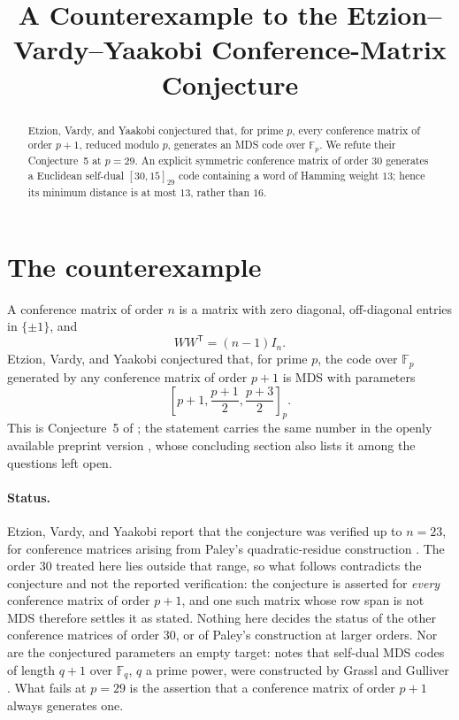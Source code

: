 \documentclass[11pt]{amsart}
\title[A conference-matrix counterexample]
{A Counterexample to the Etzion--Vardy--Yaakobi Conference-Matrix Conjecture}
\date{}
\newcommand{\F}{\mathbb{F}}
\begin{document}
\begin{abstract}
Etzion, Vardy, and Yaakobi conjectured that, for prime $p$, every
conference matrix of order $p+1$, reduced modulo $p$, generates an
MDS code over $\F_p$. We refute their Conjecture~5 at $p=29$.
An explicit symmetric conference matrix of order $30$ generates a
Euclidean self-dual $[30,15]_{29}$ code containing a word of Hamming
weight $13$; hence its minimum distance is at most $13$, rather than
$16$.
\end{abstract}

\maketitle

\section{The counterexample}

A conference matrix of order $n$ is a matrix with zero diagonal,
off-diagonal entries in $\{\pm1\}$, and
\[
  WW^{\mathsf T}=(n-1)I_n.
\]
Etzion, Vardy, and Yaakobi conjectured that, for prime $p$, the code
over $\F_p$ generated by any conference matrix of order $p+1$ is MDS
with parameters
\[
  \left[p+1,\frac{p+1}{2},\frac{p+3}{2}\right]_p.
\]
This is Conjecture~5 of \cite{EVY}; the statement carries the same number
in the openly available preprint version \cite{EVYpre}, whose concluding
section also lists it among the questions left open.

\paragraph{Status.}
Etzion, Vardy, and Yaakobi report that the conjecture was verified up to
$n=23$, for conference matrices arising from Paley's quadratic-residue
construction \cite{EVY,EVYpre}. The order $30$ treated here lies outside
that range, so what follows contradicts the conjecture and not the
reported verification: the conjecture is asserted for \emph{every}
conference matrix of order $p+1$, and one such matrix whose row span is
not MDS therefore settles it as stated. Nothing here decides the status
of the other conference matrices of order $30$, or of Paley's
construction at larger orders. Nor are the conjectured parameters an
empty target: \cite{EVY} notes that self-dual MDS codes of length $q+1$
over $\F_q$, $q$ a prime power, were constructed by Grassl and Gulliver
\cite{GrGu}. What fails at $p=29$ is the assertion that a conference
matrix of order $p+1$ always generates one.
\end{document}
